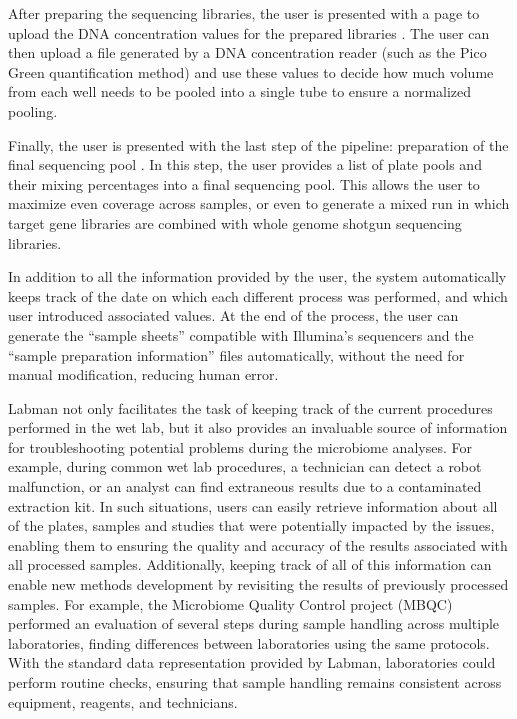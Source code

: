 After preparing the sequencing libraries, the user is presented with a page to
upload the DNA concentration values for the prepared libraries
. The user can then upload a file generated by a DNA concentration reader (such
as the Pico Green quantification method) and use these values to decide how much
volume from each well needs to be pooled into a single tube to ensure a normalized
pooling.

Finally, the user is presented with the last step of the pipeline: preparation of
the final sequencing pool
. In this step, the user provides a list of plate pools and their mixing
percentages into a final sequencing pool. This allows the user to maximize even
coverage across samples, or even to generate a mixed run in which target gene
libraries are combined with whole genome shotgun sequencing libraries.

In addition to all the information provided by the user, the system
automatically keeps track of the date on which each different process was
performed, and which user introduced associated values. At the end of the process,
the user can generate the “sample sheets” compatible with Illumina’s sequencers
and the “sample preparation information” files automatically, without the need
for manual modification, reducing human error.

Labman not only facilitates the task of keeping track of the current procedures
performed in the wet lab, but it also provides an invaluable source of information
for troubleshooting potential problems during the microbiome analyses. For example,
during common wet lab procedures, a technician can detect a robot malfunction, or
an analyst can find extraneous results due to a contaminated extraction kit. In
such situations, users can easily retrieve information about all of the plates,
samples and studies that were potentially impacted by the issues, enabling them
to ensuring the quality and accuracy of the results associated with all processed
samples. Additionally, keeping track of all of this information can enable new
methods development by revisiting the results of previously processed samples.
For example, the Microbiome Quality Control project (MBQC) \cite{Sinha2017} performed an
evaluation of several steps during sample handling across multiple laboratories,
finding differences between laboratories using the same protocols. With the
standard data representation provided by Labman, laboratories could perform
routine checks, ensuring that sample handling remains consistent across equipment,
reagents, and technicians.

